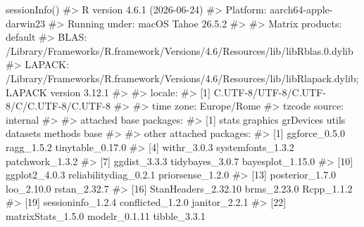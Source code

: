 \documentclass[
  italian,
  letterpaper,
  a4paper,
  11pt,
  open=any]{scrbook}
\newenvironment{Shaded}{\begin{snugshade}}{\end{snugshade}}
\newcommand{\CommentTok}[1]{\textcolor[rgb]{0.37,0.37,0.37}{#1}}
\newcommand{\FunctionTok}[1]{\textcolor[rgb]{0.28,0.35,0.67}{#1}}
\newcommand{\NormalTok}[1]{\textcolor[rgb]{0.00,0.23,0.31}{#1}}
\theoremstyle{plain}
\theoremstyle{definition}
\theoremstyle{definition}
\theoremstyle{remark}
\begin{document}
\begin{tcolorbox}[enhanced jigsaw, arc=.35mm, bottomrule=.15mm, bottomtitle=1mm, breakable, colback=white, colbacktitle=quarto-callout-note-color!10!white, colframe=quarto-callout-note-color-frame, coltitle=black, left=2mm, leftrule=.75mm, opacityback=0, opacitybacktitle=0.6, rightrule=.15mm, title=\textcolor{quarto-callout-note-color}{\faInfo}\hspace{0.5em}{Informazioni sull'ambiente di sviluppo}, titlerule=0mm, toprule=.15mm, toptitle=1mm]

\begin{Shaded}
\begin{Highlighting}[]
\FunctionTok{sessionInfo}\NormalTok{()}
\CommentTok{\#\textgreater{} R version 4.6.1 (2026{-}06{-}24)}
\CommentTok{\#\textgreater{} Platform: aarch64{-}apple{-}darwin23}
\CommentTok{\#\textgreater{} Running under: macOS Tahoe 26.5.2}
\CommentTok{\#\textgreater{} }
\CommentTok{\#\textgreater{} Matrix products: default}
\CommentTok{\#\textgreater{} BLAS:   /Library/Frameworks/R.framework/Versions/4.6/Resources/lib/libRblas.0.dylib }
\CommentTok{\#\textgreater{} LAPACK: /Library/Frameworks/R.framework/Versions/4.6/Resources/lib/libRlapack.dylib;  LAPACK version 3.12.1}
\CommentTok{\#\textgreater{} }
\CommentTok{\#\textgreater{} locale:}
\CommentTok{\#\textgreater{} [1] C.UTF{-}8/UTF{-}8/C.UTF{-}8/C/C.UTF{-}8/C.UTF{-}8}
\CommentTok{\#\textgreater{} }
\CommentTok{\#\textgreater{} time zone: Europe/Rome}
\CommentTok{\#\textgreater{} tzcode source: internal}
\CommentTok{\#\textgreater{} }
\CommentTok{\#\textgreater{} attached base packages:}
\CommentTok{\#\textgreater{} [1] stats     graphics  grDevices utils     datasets  methods   base     }
\CommentTok{\#\textgreater{} }
\CommentTok{\#\textgreater{} other attached packages:}
\CommentTok{\#\textgreater{}  [1] ggforce\_0.5.0         ragg\_1.5.2            tinytable\_0.17.0     }
\CommentTok{\#\textgreater{}  [4] withr\_3.0.3           systemfonts\_1.3.2     patchwork\_1.3.2      }
\CommentTok{\#\textgreater{}  [7] ggdist\_3.3.3          tidybayes\_3.0.7       bayesplot\_1.15.0     }
\CommentTok{\#\textgreater{} [10] ggplot2\_4.0.3         reliabilitydiag\_0.2.1 priorsense\_1.2.0     }
\CommentTok{\#\textgreater{} [13] posterior\_1.7.0       loo\_2.10.0            rstan\_2.32.7         }
\CommentTok{\#\textgreater{} [16] StanHeaders\_2.32.10   brms\_2.23.0           Rcpp\_1.1.2           }
\CommentTok{\#\textgreater{} [19] sessioninfo\_1.2.4     conflicted\_1.2.0      janitor\_2.2.1        }
\CommentTok{\#\textgreater{} [22] matrixStats\_1.5.0     modelr\_0.1.11         tibble\_3.3.1         }

\end{Highlighting}
\end{Shaded}
\end{tcolorbox}
\end{document}
